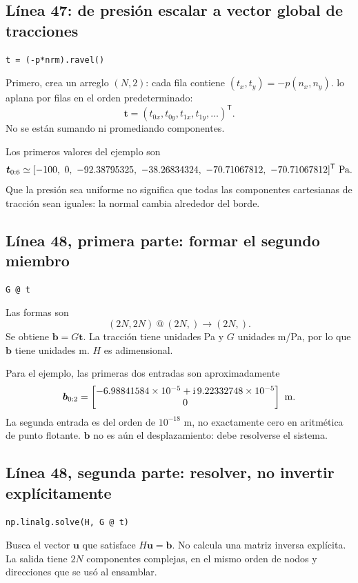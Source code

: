 \documentclass[11pt,a4paper]{article}
\numberwithin{equation}{section}
\newcommand{\vect}[1]{\bm{#1}}
\newcommand{\ii}{\mathrm{i}}
\DeclareRobustCommand{\code}[1]{\texttt{\detokenize{#1}}}
\begin{document}
\subsection{L\'inea 47: de presi\'on escalar a vector global de tracciones}
\begin{lstlisting}
t = (-p*nrm).ravel()
\end{lstlisting}
Primero, \code{-p*nrm} crea un arreglo $(N,2)$:
cada fila contiene $(t_x,t_y)=-p(n_x,n_y)$.
\code{ravel()} lo aplana por filas en el orden predeterminado:
\begin{equation}
 \vect t=(t_{0x},t_{0y},t_{1x},t_{1y},\ldots)^{\mathsf T}.
\end{equation}
No se est\'an sumando ni promediando componentes.

Los primeros valores del ejemplo son
\begin{equation}
 \vect t_{0:6}\simeq
 [-100,\ 0,\ -92.38795325,\ -38.26834324,\
    -70.71067812,\ -70.71067812]^{\mathsf T}\ {\rm Pa}.
\end{equation}
Que la presi\'on sea uniforme no significa que todas las componentes
cartesianas de tracci\'on sean iguales: la normal cambia alrededor del borde.

\subsection{L\'inea 48, primera parte: formar el segundo miembro}
\begin{lstlisting}
G @ t
\end{lstlisting}
Las formas son
\begin{equation}
 (2N,2N)\ @\ (2N,)\longrightarrow(2N,).
\end{equation}
Se obtiene $\vect b=G\vect t$.
La tracci\'on tiene unidades Pa y $G$ unidades m/Pa, por lo que
$\vect b$ tiene unidades m. $H$ es adimensional.

Para el ejemplo, las primeras dos entradas son aproximadamente
\begin{equation}
 \vect b_{0:2}=
 \begin{bmatrix}
 -6.98841584\times10^{-5}+\ii\,9.22332748\times10^{-5}\\
 0
 \end{bmatrix}\ {\rm m}.
\end{equation}
La segunda entrada es del orden de $10^{-18}$ m, no exactamente cero
en aritm\'etica de punto flotante.
$\vect b$ no es a\'un el desplazamiento: debe resolverse el sistema.

\subsection{L\'inea 48, segunda parte: resolver, no invertir expl\'icitamente}
\begin{lstlisting}
np.linalg.solve(H, G @ t)
\end{lstlisting}
Busca el vector $\vect u$ que satisface $H\vect u=\vect b$.
No calcula una matriz inversa expl\'icita.
La salida tiene $2N$ componentes complejas, en el mismo orden
de nodos y direcciones que se us\'o al ensamblar.
\end{document}
